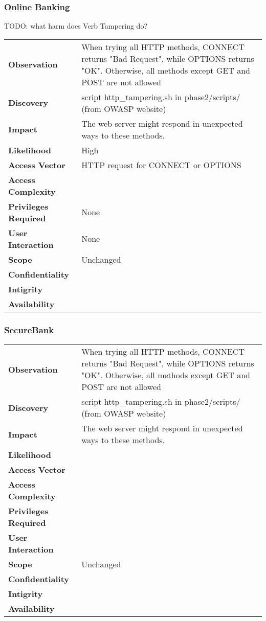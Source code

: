 \subsubsection*{Online Banking}
TODO: what harm does Verb Tampering do?

\begin{tabular}{l|p{10cm}}
\textbf{Observation} & When trying all HTTP methods, CONNECT returns "Bad Request", while OPTIONS returns "OK". Otherwise, all methods except GET and POST are not allowed\\
\textbf{Discovery} & script http\_tampering.sh in phase2/scripts/ (from OWASP website) \\
\textbf{Impact} & The web server might respond in unexpected ways to these methods. \\
\textbf{Likelihood} & High \\
\textbf{Access Vector} & HTTP request for CONNECT or OPTIONS\\
\textbf{Access Complexity} & \\
\textbf{Privileges Required} & None \\
\textbf{User Interaction} & None \\
\textbf{Scope} & Unchanged \\
\textbf{Confidentiality} & \\
\textbf{Intigrity} & \\
\textbf{Availability} & \\
\end{tabular}

\subsubsection*{SecureBank}

\begin{tabular}{l|p{10cm}}
\textbf{Observation} & When trying all HTTP methods, CONNECT returns "Bad Request", while OPTIONS returns "OK". Otherwise, all methods except GET and POST are not allowed\\
\textbf{Discovery} & script http\_tampering.sh in phase2/scripts/ (from OWASP website)\\
\textbf{Impact} & The web server might respond in unexpected ways to these methods.\\
\textbf{Likelihood} & \\
\textbf{Access Vector} & \\
\textbf{Access Complexity} & \\
\textbf{Privileges Required} & \\
\textbf{User Interaction} & \\
\textbf{Scope} & Unchanged \\
\textbf{Confidentiality} & \\
\textbf{Intigrity} & \\
\textbf{Availability} & \\
\end{tabular}

